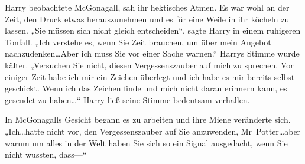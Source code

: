 Harry beobachtete McGonagall, sah ihr hektisches Atmen. Es war wohl an der Zeit, den Druck etwas herauszunehmen und es für eine Weile in ihr köcheln zu lassen. „Sie müssen sich nicht gleich entscheiden“, sagte Harry in einem ruhigeren Tonfall. „Ich verstehe es, wenn Sie Zeit brauchen, um über mein Angebot nachzudenken…Aber ich muss Sie vor einer Sache warnen.“ Harrys Stimme wurde kälter. „Versuchen Sie nicht, diesen Vergessenszauber auf mich zu sprechen. Vor einiger Zeit habe ich mir ein Zeichen überlegt und ich habe es mir bereits selbst geschickt. Wenn ich das Zeichen finde und mich nicht daran erinnern kann, es gesendet zu haben…“ Harry ließ seine Stimme bedeutsam verhallen.

In McGonagalls Gesicht begann es zu arbeiten und ihre Miene veränderte sich. „Ich…hatte nicht vor, den Vergessenszauber auf Sie anzuwenden, Mr~Potter…aber warum um alles in der Welt haben Sie sich so ein Signal ausgedacht, wenn Sie nicht wussten, dass—“

